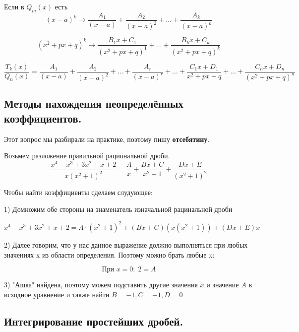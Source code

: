 \documentclass[a4paper,12pt]{article}
\theoremstyle{plain} %
\theoremstyle{definition} %
\theoremstyle{remark} %
\begin{document}
Если в $Q_m(x)$ есть
\[(x-a)^k \rightarrow \frac{A_1}{(x - a)} + \frac{A_2}{(x - a)^2} + \dots + \frac{A_k}{(x - a)^k} \]

\[ (x^2 + px + q)^k \rightarrow \frac{B_1 x+C_1}{(x^2 + px + q)^1} + \dots + \frac{B_k x+C_k}{(x^2 + px + q)^k}  \]


\[
	\frac{T_k(x)}{Q_n(x)} = \frac{A_1}{(x - a)} + \frac{A_2}{(x - a)^2} + \dots + \frac{A_r}{(x - a)^r} + \dots + \frac{C_1 x + D_1}{x^2 + px + q} + \dots + \frac{C_n x + D_n}{(x^2 + px + q)^n}
\]


\newpage
\subsection*{Методы нахождения неопределённых коэффициентов.} \label{methods}

Этот вопрос мы разбирали на практике, поэтому пишу \textbf{отсебятину}.

Возьмем разложение правильной рациональной дроби.
\[
	\frac{x^4 - x^3 + 3x^2 + x + 2}{x(x^2 + 1)^2} = \frac{A}{x} + \frac{Bx + C}{x^2 + 1} + \frac{Dx + E}{(x^2 + 1)^2}
\]

Чтобы найти коэффициенты сделаем слудующее:

1) Домножим обе стороны на знаменатель изначальной рацинальной дроби

\[
	x^4 - x^3 + 3x^2 + x + 2 = A\cdot (x^2 + 1)^2 + (Bx + C)(x(x^2 + 1)) + (Dx + E)x
\]

2) Далее говорим, что у нас данное выражение должно выполняться при любых значениях x из области определения. Поэтому можно брать любые x:

\[
	\text{При } x = 0: \; 2 = A
\]

3) "Ашка" найдена, поэтому можем подставить другие значения $x$ и значение $A$ в исходное уравнение и также найти $B = -1, C = -1, D = 0$


\newpage
\subsection*{Интегрирование простейших дробей.} \label{easiest_ints}
\end{document}
